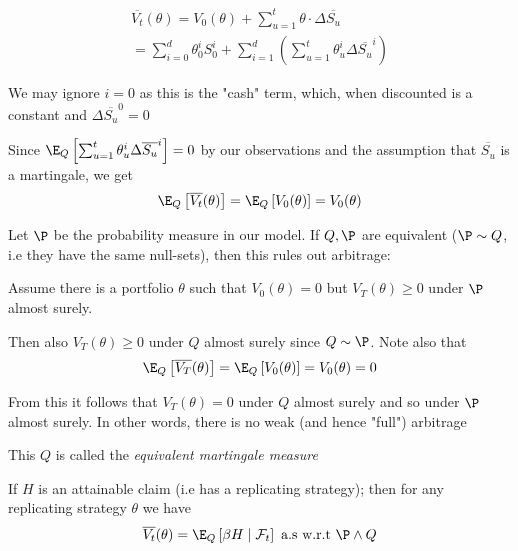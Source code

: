 \begin{equation*}
  \begin{gathered}
    \overline{V_t}(\theta) = V_0(\theta) + \sum_{u=1}^{t}\theta\cdot\Delta\overline{S_u}\\
    = \sum_{i=0}^{d}\theta_0^iS_0^i+\sum_{i=1}^{d}\left(\sum_{u=1}^{t}\theta_u^i\Delta\overline{S_u}^i\right)
  \end{gathered}
\end{equation*}\par
\noindent We may ignore $i=0$ as this is the "cash" term, which, when discounted is a constant and $\Delta \overline{S_u}^0 = 0$
\par\bigskip
\noindent Since $\E_Q\left[\sum_{u=1}^{t}\theta_u^i\Delta\overline{S_u}^i\right] = 0$ by our observations and the assumption that $\overline{S_u}$ is a martingale, we get 
\begin{equation*}
  \begin{gathered}
    \E_Q\left[\overline{V_t}(\theta)\right] = \E_Q\left[V_0(\theta)\right] = V_0(\theta)
  \end{gathered}
\end{equation*}\par
\noindent Let $\P$ be the probability measure in our model. If $Q,\P$ are equivalent ($\P\sim Q$, i.e they have the same null-sets), then this rules out arbitrage:
\par\bigskip
\noindent Assume there is a portfolio $\theta$ such that $V_0(\theta) = 0$ but $V_T(\theta)\geq0$ under $\P$ almost surely.\par
\noindent Then also $V_T(\theta)\geq0$ under $Q$ almost surely since $Q\sim\P$. Note also that
\begin{equation*}
  \begin{gathered}
    \E_Q\left[\overline{V_T}(\theta)\right] = \E_Q\left[V_0(\theta)\right] = V_0(\theta)= 0
  \end{gathered}
\end{equation*}\par
\noindent From this it follows that $V_T(\theta) = 0$ under $Q$ almost surely and so under $\P$ almost surely. In other words, there is no weak (and hence "full") arbitrage\par
\noindent This $Q$ is called the \textit{equivalent martingale measure}
\par\bigskip
\begin{lem}[]{}
  If $H$ is an attainable claim (i.e has a replicating strategy); then for any replicating strategy $\theta$ we have
  \begin{equation*}
    \begin{gathered}
      \overline{V_t}(\theta)= \E_Q\left[\beta H\mid \mathcal{F}_t\right]\text{ a.s w.r.t } \P\wedge Q
    \end{gathered}
  \end{equation*}
\end{lem}

